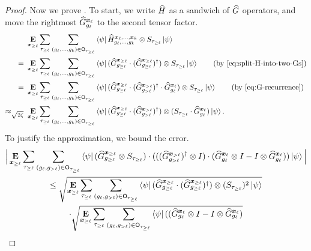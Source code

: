 \begin{proof}
Now we prove .
To start, we write $\widehat{H}$ as a sandwich of $\widehat{G}$ operators, and move the
rightmost $\widehat{G}^{{\boldsymbol{x}}_{\ell}}_{g_{\ell}}$ to the second tensor factor.
\begin{align}
&\E_{\bx_{\geq \ell}} \sum_{\tau_{\geq \ell}}  \sum_{(g_{\ell}, \ldots,g_k) \in \sfO_{\tau_{\geq \ell}}}
	\bra{\psi} \widehat{H}^{\bx_{\ell}, \dots, \bx_{k}}_{g_{\ell}, \dots, g_{k}} \ot S_{\tau_{\geq \ell}}\ket{\psi}\nonumber\\
=~&\E_{\bx_{\geq \ell}} \sum_{\tau_{\geq \ell}}  \sum_{(g_{\ell}, \ldots,g_k) \in \sfO_{\tau_{\geq \ell}}}
	\bra{\psi} (\wG^{\bx_{\geq \ell}}_{g_{\geq \ell}} \cdot (\wG^{\bx_{\geq \ell}}_{g_{\geq \ell}})^\dagger) \ot S_{\tau_{\geq \ell}}\ket{\psi}\tag{by \Cref{eq:split-H-into-two-Gs}}\\
=~&\E_{\bx_{\geq \ell}} \sum_{\tau_{\geq \ell}}  \sum_{(g_{\ell}, \ldots,g_k) \in \sfO_{\tau_{\geq \ell}}}
	\bra{\psi} (\wG^{\bx_{\geq \ell}}_{g_{\geq \ell}} \cdot (\wG^{\bx_{> \ell}}_{g_{> \ell}})^\dagger \cdot \wG^{\bx_{\ell}}_{g_{\ell}}) \ot S_{\tau_{\geq \ell}}\ket{\psi}\tag{by \Cref{eq:G-recurrence}}\\
\approx_{\sqrt{2\zeta}}~&\E_{\bx_{\geq \ell}} \sum_{\tau_{\geq \ell}}  \sum_{(g_{\ell}, \ldots,g_k) \in \sfO_{\tau_{\geq \ell}}}
	\bra{\psi} (\wG^{\bx_{\geq \ell}}_{g_{\geq \ell}} \cdot (\wG^{\bx_{> \ell}}_{g_{> \ell}})^\dagger) \ot (S_{\tau_{\geq \ell}} \cdot \wG^{\bx_{\ell}}_{g_{\ell}})\ket{\psi}.\label{eq:move-g-over-there}
\end{align}
To justify the approximation, we bound the error.
\begin{multline}\label{eq:call-again-later-part-tres}
\Big|\mathop{\bf E\/}_{{\boldsymbol{x}}_{\geq \ell}} \sum_{\tau_{\geq \ell}}  \sum_{(g_{\ell}, g_{>\ell}) \in \mathsf{O}_{\tau_{\geq \ell}}}
	\bra{\psi} (\widehat{G}^{{\boldsymbol{x}}_{\geq \ell}}_{g_{\geq \ell}}
		\otimes S_{\tau_{\geq \ell}}) \cdot (((\widehat{G}^{{\boldsymbol{x}}_{> \ell}}_{g_{> \ell}})^\dagger \otimes I) \cdot (\widehat{G}^{{\boldsymbol{x}}_{\ell}}_{g_{\ell}} \otimes I - I \otimes \widehat{G}^{{\boldsymbol{x}}_{\ell}}_{g_{\ell}} ))\ket{\psi}\Big|\\
\leq \sqrt{\mathop{\bf E\/}_{{\boldsymbol{x}}_{\geq \ell}} \sum_{\tau_{\geq \ell}}  \sum_{(g_{\ell}, g_{>\ell}) \in \mathsf{O}_{\tau_{\geq \ell}}}
	\bra{\psi} (\widehat{G}^{{\boldsymbol{x}}_{\geq \ell}}_{g_{\geq \ell}} \cdot (\widehat{G}^{{\boldsymbol{x}}_{\geq \ell}}_{g_{\geq \ell}})^\dagger)
		\otimes (S_{\tau_{\geq \ell}})^2 \ket{\psi}}\\
\cdot \sqrt{\mathop{\bf E\/}_{{\boldsymbol{x}}_{\geq \ell}} \sum_{\tau_{\geq \ell}}  \sum_{
	(g_{\ell}, g_{>\ell}) \in \mathsf{O}_{\tau_{\geq \ell}}}
		\bra{\psi} ((\widehat{G}^{{\boldsymbol{x}}_{\ell}}_{g_{\ell}} \otimes I - I \otimes \widehat{G}^{{\boldsymbol{x}}_{\ell}}_{g_{\ell}} )
}
\end{multline}
\end{proof}
